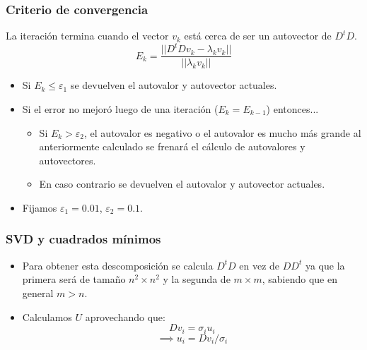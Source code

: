 \documentclass{beamer}
\begin{document}
\begin{frame}
\frametitle{Criterio de convergencia}
La iteración termina cuando el vector $v_{k}$ está cerca de ser un autovector de $D^{t}D$.
\[
E_k = \frac{||D^tDv_k - \lambda_k v_k||}{||\lambda_k v_k||}
\]
\begin{itemize}
\item<1-> Si $E_k \leq \varepsilon_1$ se devuelven el autovalor y autovector actuales.
\item<2-> Si el error no mejoró luego de una iteración ($E_k = E_{k-1}$) entonces...
\begin{itemize}
\item<3-> Si $E_k > \varepsilon_2$, el autovalor es negativo o el autovalor es mucho más grande al anteriormente 
calculado se frenará el cálculo de autovalores y autovectores.
\item<4-> En caso contrario se devuelven el autovalor y autovector actuales.
\end{itemize}
\item<5-> Fijamos $\varepsilon_1 = 0.01$, $\varepsilon_2 = 0.1$.
\end{itemize}
\end{frame}

\begin{frame}
\frametitle{SVD y cuadrados mínimos}
\begin{itemize}
\item<1->Para obtener esta descomposición se calcula $D^{t}D$ en vez de $DD^{t}$ ya que la primera será de tamaño $n^{2} \times n^{2}$ y la segunda 
de $m \times m$, sabiendo que en general $m > n$.
\item<2->Calculamos $U$ aprovechando que:
\[
D v_i = \sigma_i u_i
\]
\[
\implies u_i = D v_i / \sigma_i
\]
\end{itemize}
\end{frame}
\end{document}
